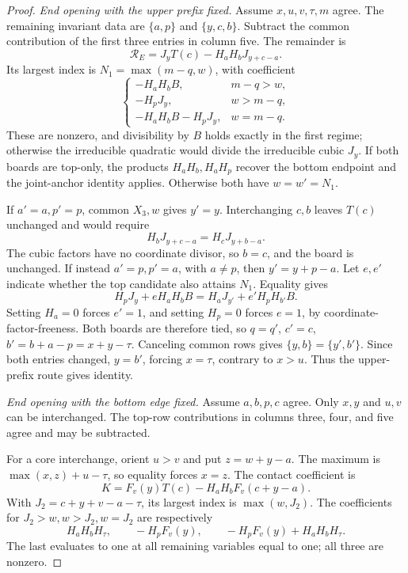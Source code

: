 \documentclass[11pt,a4paper]{amsart}
\numberwithin{equation}{section}
\theoremstyle{plain}
\theoremstyle{definition}
\begin{document}
\begin{proof}
\emph{End opening with the upper prefix fixed.}
Assume \(x,u,v,\tau,m\) agree.  The remaining invariant data are
\(\{a,p\}\) and \(\{y,c,b\}\).  Subtract the common contribution
of the first three entries in column five.  The remainder is
\[
 \mathcal R_E=J_yT(c)-H_aH_bJ_{y+c-a}.
\]
Its largest index is \(N_1=\max(m-q,w)\), with coefficient
\[
 \begin{cases}
 -H_aH_bB,&m-q>w,\\
 -H_pJ_y,&w>m-q,\\
 -H_aH_bB-H_pJ_y,&w=m-q.
 \end{cases}
\]
These are nonzero, and divisibility by \(B\) holds exactly in the
first regime; otherwise the irreducible quadratic would divide the
irreducible cubic \(J_y\).  If both boards are top-only, the products
\(H_aH_b,H_aH_p\) recover the bottom endpoint and the joint-anchor
identity applies.  Otherwise both have \(w=w'=N_1\).  

If \(a'=a,p'=p\), common \(X_3,w\) gives \(y'=y\).  Interchanging
\(c,b\) leaves \(T(c)\) unchanged and would require
\[
 H_bJ_{y+c-a}=H_cJ_{y+b-a}.
\]
The cubic factors have no coordinate divisor, so \(b=c\), and the
board is unchanged.  If instead \(a'=p,p'=a\), with \(a\ne p\),
then \(y'=y+p-a\).  Let \(e,e'\) indicate whether the top candidate
also attains \(N_1\).  Equality gives
\[
 H_pJ_y+eH_aH_bB=H_aJ_{y'}+e'H_pH_{b'}B.
\]
Setting \(H_a=0\) forces \(e'=1\), and setting \(H_p=0\) forces
\(e=1\), by coordinate-factor-freeness.  Both boards are therefore
tied, so \(q=q'\), \(c'=c\), \(b'=b+a-p=x+y-\tau\).  
Canceling common rows gives \(\{y,b\}=\{y',b'\}\).  Since both
entries changed, \(y=b'\), forcing \(x=\tau\), contrary to \(x>u\).  
Thus the upper-prefix route gives identity.  

\emph{End opening with the bottom edge fixed.}
Assume \(a,b,p,c\) agree.  Only \(x,y\) and \(u,v\) can be
interchanged.  The top-row contributions in columns three, four, and
five agree and may be subtracted.  

For a core interchange, orient \(u>v\) and put \(z=w+y-a\).  
The maximum is \(\max(x,z)+u-\tau\), so equality forces \(x=z\).  
The contact coefficient is
\[
 K=F_v(y)T(c)-H_aH_bF_v(c+y-a).
\]
With \(J_2=c+y+v-a-\tau\), its largest index is
\(\max(w,J_2)\).  The coefficients for \(J_2>w,w>J_2,w=J_2\)
are respectively
\[
 H_aH_bH_\tau,\qquad -H_pF_v(y),\qquad
 -H_pF_v(y)+H_aH_bH_\tau.
\]
The last evaluates to one at all remaining variables equal to one;
all three are nonzero.  


\end{proof}
\end{document}
